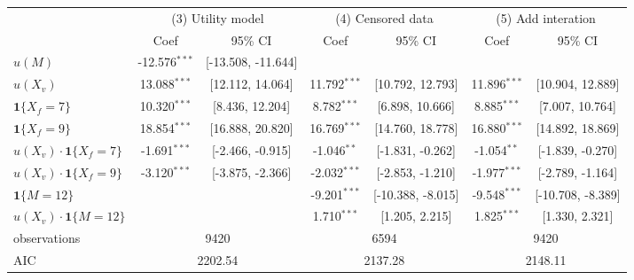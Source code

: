 \begin{tabular}{lcccccc}
  \hline
   & \multicolumn{2}{c}{(3) Utility model} & \multicolumn{2}{c}{(4) Censored data} & \multicolumn{2}{c}{(5) Add interation} \\ & Coef & 95\% CI & Coef & 95\% CI & Coef & 95\% CI \\ \hline
$u(M)$ & -12.576$^{***}$ & [-13.508, -11.644] &  &  &  &  \\ 
  $u(X_v)$ & 13.088$^{***}$ & [12.112, 14.064] & 11.792$^{***}$ & [10.792, 12.793] & 11.896$^{***}$ & [10.904, 12.889] \\ 
  $\textbf{1}\{X_f = 7\}$ & 10.320$^{***}$ & [8.436, 12.204] & 8.782$^{***}$ & [6.898, 10.666] & 8.885$^{***}$ & [7.007, 10.764] \\ 
  $\textbf{1}\{X_f = 9\}$ & 18.854$^{***}$ & [16.888, 20.820] & 16.769$^{***}$ & [14.760, 18.778] & 16.880$^{***}$ & [14.892, 18.869] \\ 
  $u(X_v)\cdot\textbf{1}\{X_f = 7\}$ & -1.691$^{***}$ & [-2.466, -0.915] & -1.046$^{**}$ & [-1.831, -0.262] & -1.054$^{**}$ & [-1.839, -0.270] \\ 
  $u(X_v)\cdot\textbf{1}\{X_f = 9\}$ & -3.120$^{***}$ & [-3.875, -2.366] & -2.032$^{***}$ & [-2.853, -1.210] & -1.977$^{***}$ & [-2.789, -1.164] \\ 
  $\textbf{1}\{M = 12\}$ &  &  & -9.201$^{***}$ & [-10.388, -8.015] & -9.548$^{***}$ & [-10.708, -8.389] \\ 
  $u(X_v)\cdot\textbf{1}\{M = 12\}$ &  &  & 1.710$^{***}$ & [1.205, 2.215] & 1.825$^{***}$ & [1.330, 2.321] \\ 
   \hline observations & \multicolumn{2}{c}{9420} & \multicolumn{2}{c}{6594} & \multicolumn{2}{c}{9420} \\ AIC & \multicolumn{2}{c}{2202.54} & \multicolumn{2}{c}{2137.28} & \multicolumn{2}{c}{2148.11} \\ \hline
\end{tabular}

